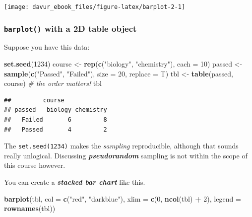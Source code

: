 \documentclass[]{book}
\newenvironment{Shaded}{\begin{snugshade}}{\end{snugshade}}
\newcommand{\CommentTok}[1]{\textcolor[rgb]{0.56,0.35,0.01}{\textit{#1}}}
\newcommand{\DataTypeTok}[1]{\textcolor[rgb]{0.13,0.29,0.53}{#1}}
\newcommand{\DecValTok}[1]{\textcolor[rgb]{0.00,0.00,0.81}{#1}}
\newcommand{\KeywordTok}[1]{\textcolor[rgb]{0.13,0.29,0.53}{\textbf{#1}}}
\newcommand{\NormalTok}[1]{#1}
\newcommand{\OperatorTok}[1]{\textcolor[rgb]{0.81,0.36,0.00}{\textbf{#1}}}
\newcommand{\StringTok}[1]{\textcolor[rgb]{0.31,0.60,0.02}{#1}}
\begin{document}
\begin{center}\texttt{[image: davur\_ebook\_files/figure-latex/barplot-2-1]} \end{center}

\hypertarget{barplot-with-a-2d-table-object}{%
\subsubsection*{\texorpdfstring{\texttt{barplot()} with a 2D table object}{barplot() with a 2D table object}}\label{barplot-with-a-2d-table-object}}

Suppose you have this data:

\begin{Shaded}
\begin{Highlighting}[]
\KeywordTok{set.seed}\NormalTok{(}\DecValTok{1234}\NormalTok{) }
\NormalTok{course <-}\StringTok{ }\KeywordTok{rep}\NormalTok{(}\KeywordTok{c}\NormalTok{(}\StringTok{"biology"}\NormalTok{, }\StringTok{"chemistry"}\NormalTok{), }\DataTypeTok{each =} \DecValTok{10}\NormalTok{)}
\NormalTok{passed <-}\StringTok{ }\KeywordTok{sample}\NormalTok{(}\KeywordTok{c}\NormalTok{(}\StringTok{"Passed"}\NormalTok{, }\StringTok{"Failed"}\NormalTok{), }\DataTypeTok{size =} \DecValTok{20}\NormalTok{, }\DataTypeTok{replace =}\NormalTok{ T)}
\NormalTok{tbl <-}\StringTok{ }\KeywordTok{table}\NormalTok{(passed, course) }\CommentTok{# the order matters!}
\NormalTok{tbl}
\end{Highlighting}
\end{Shaded}

\begin{verbatim}
##         course
## passed   biology chemistry
##   Failed       6         8
##   Passed       4         2
\end{verbatim}

The \texttt{set.seed(1234)} makes the \emph{sampling} reproducible, although that sounds really unlogical. Discussing \textbf{\emph{pseudorandom}} sampling is not within the scope of this course however.

You can create a \textbf{\emph{stacked bar chart}} like this.

\begin{Shaded}
\begin{Highlighting}[]
\KeywordTok{barplot}\NormalTok{(tbl, }
        \DataTypeTok{col =} \KeywordTok{c}\NormalTok{(}\StringTok{"red"}\NormalTok{, }\StringTok{"darkblue"}\NormalTok{), }
        \DataTypeTok{xlim =} \KeywordTok{c}\NormalTok{(}\DecValTok{0}\NormalTok{, }\KeywordTok{ncol}\NormalTok{(tbl) }\OperatorTok{+}\StringTok{ }\DecValTok{2}\NormalTok{), }
        \DataTypeTok{legend =} \KeywordTok{rownames}\NormalTok{(tbl))}
\end{Highlighting}
\end{Shaded}
\end{document}
